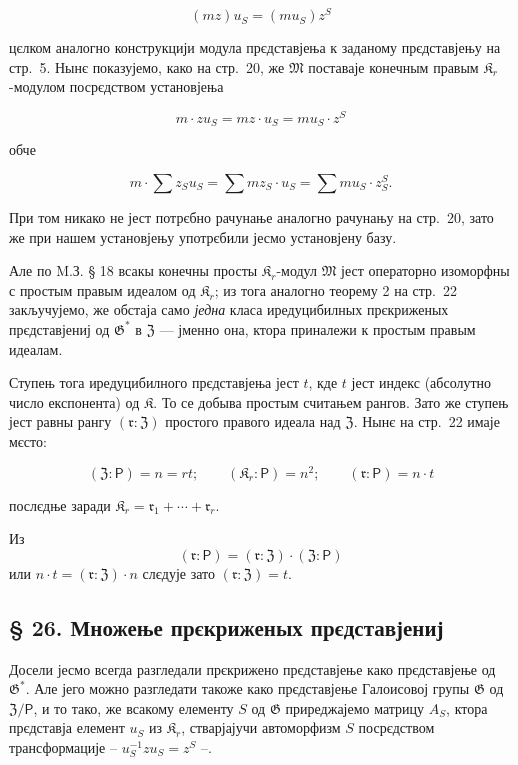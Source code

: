 \documentclass[11pt]{article}
\begin{document}
\[(mz) u_S = (mu_S) z^S\]

цєлком аналогно конструкцији модула прєдставјења к заданому прєдставјењу на стр.~5. Нынє показујемо, како на стр.~20, же \(\mathfrak{M}\) поставаје конечным правым \(\mathfrak K_r\)-модулом посрєдством установјења

\[m \cdot z u_S = mz \cdot u_S = mu_S \cdot z^S\]

обче

\[m \cdot \sum z_S u_S = \sum m z_S \cdot u_S = \sum m u_S \cdot z_S^S.\]

При том никако не јест потрєбно рачунање аналогно рачунању на стр.~20, зато же при нашем установјењу употрєбили јесмо установјену базу.

Але по M.З. § 18 всакы конечны просты \(\mathfrak K_r\)-модул \(\mathfrak{M}\) јест операторно изоморфны с простым правым идеалом од \(\mathfrak K_r\); из тога аналогно теорему 2 на стр.~22 закључујемо, же обстаја само \emph{једна} класа иредуцибилных прєкриженых прєдставјениј од \(\mathfrak{G}^*\) в \(\mathfrak Z\) --- јменно она, ктора приналежи к простым правым идеалам.

Ступењ тога иредуцибилного прєдставјења јест \(t\), кде \(t\) јест индекс (абсолутно число експонента) од \(\mathfrak K\). То се добыва простым считањем рангов. Зато же ступењ јест равны рангу \((\mathfrak r:\mathfrak Z)\) простого правого идеала над \(\mathfrak Z\). Нынє на стр.~22 имаје мєсто:

\[
(\mathfrak Z:\mathsf{P})=n=rt;\qquad (\mathfrak K_r:\mathsf{P})=n^2;\qquad (\mathfrak r:\mathsf{P})=n\cdot t
\]

послєдње заради \(\mathfrak K_r = \mathfrak{r}_1 + \cdots + \mathfrak{r}_r\).

Из
\[(\mathfrak{r}: \mathsf{P}) = (\mathfrak{r}: \mathfrak Z) \cdot (\mathfrak Z: \mathsf{P})\]
или \(n \cdot t = (\mathfrak{r}: \mathfrak Z) \cdot n\) слєдује зато \((\mathfrak{r}: \mathfrak Z) = t\).

\subsection*{§ 26. Множење прєкриженых прєдставјениј}\label{multiplikation-der-verschraenkten-darstellungen}

Досели јесмо всегда разгледали прєкрижено прєдставјење како прєдставјење од \(\mathfrak{G}^*\). Але јего можно разгледати такоже како прєдставјење Галоисовој групы \(\mathfrak{G}\) од \(\mathfrak Z/\mathsf{P}\), и то тако, же всакому елементу \(S\) од \(\mathfrak{G}\) приреджајемо матрицу \(A_S\), ктора прєдставја елемент \(u_S\) из \(\mathfrak K_r\), стварјајучи автоморфизм \(S\) посрєдством трансформације -- \(u_S^{-1}zu_S=z^S\) --.
\end{document}
